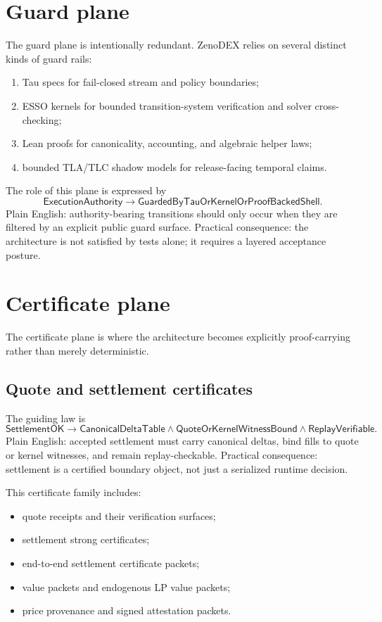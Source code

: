 \documentclass[10pt]{extarticle}
\begin{document}
\section{Guard plane}
The guard plane is intentionally redundant. ZenoDEX relies on several distinct
kinds of guard rails:
\begin{enumerate}
  \item Tau specs for fail-closed stream and policy boundaries;
  \item ESSO kernels for bounded transition-system verification and solver
  cross-checking;
  \item Lean proofs for canonicality, accounting, and algebraic helper laws;
  \item bounded TLA/TLC shadow models for release-facing temporal claims.
\end{enumerate}

The role of this plane is expressed by
\[
\mathsf{ExecutionAuthority} \to \mathsf{GuardedByTauOrKernelOrProofBackedShell}.
\]
Plain English: authority-bearing transitions should only occur when they are
filtered by an explicit public guard surface.
Practical consequence: the architecture is not satisfied by tests alone; it
requires a layered acceptance posture.

\section{Certificate plane}
The certificate plane is where the architecture becomes explicitly
proof-carrying rather than merely deterministic.

\subsection{Quote and settlement certificates}
The guiding law is
\[
\mathsf{SettlementOK}
\to \mathsf{CanonicalDeltaTable}
\wedge \mathsf{QuoteOrKernelWitnessBound}
\wedge \mathsf{ReplayVerifiable}.
\]
Plain English: accepted settlement must carry canonical deltas, bind fills to
quote or kernel witnesses, and remain replay-checkable.
Practical consequence: settlement is a certified boundary object, not just a
serialized runtime decision.

This certificate family includes:
\begin{itemize}
  \item quote receipts and their verification surfaces;
  \item settlement strong certificates;
  \item end-to-end settlement certificate packets;
  \item value packets and endogenous LP value packets;
  \item price provenance and signed attestation packets.
\end{itemize}
\end{document}
